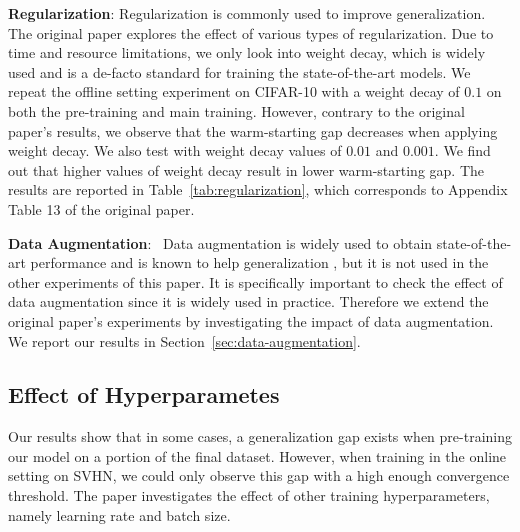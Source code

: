 \textbf{Regularization}: Regularization is commonly used to improve generalization. The original paper explores the effect of various types of regularization. Due to time and resource limitations, we only look into weight decay, which is widely used and is a de-facto standard for training the state-of-the-art models. We repeat the offline setting experiment on CIFAR-10 with a weight decay of $0.1$ on both the pre-training and main training. However, contrary to the original paper's results, we observe that the warm-starting gap decreases when applying weight decay. We also test with weight decay values of $0.01$ and $0.001$. We find out that higher values of weight decay result in lower warm-starting gap. The results are reported in Table~\ref{tab:regularization}, which corresponds to Appendix Table 13 of the original paper.


\textbf{Data Augmentation}:~ Data augmentation is widely used to obtain state-of-the-art performance and is known to help generalization \cite{shorten2019survey}, but it is not used in the other experiments of this paper. It is specifically important to check the effect of data augmentation since it is widely used in practice. Therefore we extend the original paper's experiments by investigating the impact of data augmentation. We report our results in Section~\ref{sec:data-augmentation}.

\subsection{Effect of Hyperparametes}

Our results show that in some cases, a generalization gap exists when pre-training our model on a portion of the final dataset. However, when training in the online setting on SVHN, we could only observe this gap with a high enough convergence threshold. The paper investigates the effect of other training hyperparameters, namely learning rate and batch size.


